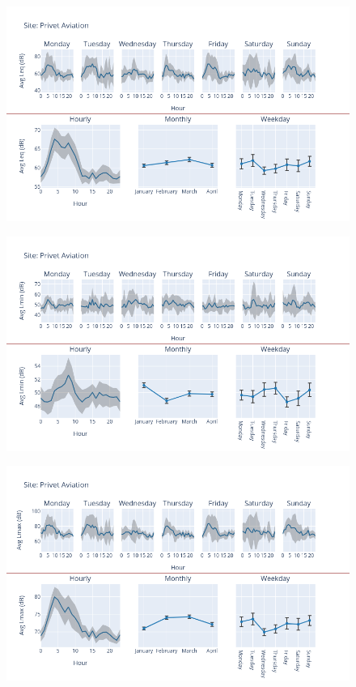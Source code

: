 \documentclass[12pt, oneside]{book}
\begin{document}
{ 
{\begin{figure}[H] 
 \centering 
\includegraphics[width=.88\textwidth, keepaspectratio]{image119} 
 \end{figure}}{} 

{\begin{figure}[H] 
 \centering 
\includegraphics[width=.88\textwidth, keepaspectratio]{image120} 
 \end{figure}}{} 

{\begin{figure}[H] 
 \centering 
\includegraphics[width=.88\textwidth, keepaspectratio]{image121} 
 \end{figure}}{} 

}
\end{document}

